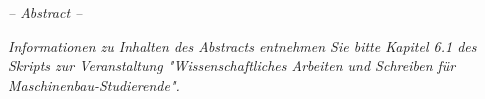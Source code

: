 \begin{center}
\begin{minipage}[c][\textheight][c]{0.7\textwidth}
    \begin{center} \textit{\Large{-- Abstract --}} \end{center}
    \emph{Informationen zu Inhalten des Abstracts entnehmen Sie bitte Kapitel 6.1 des Skripts zur Veranstaltung "Wissenschaftliches Arbeiten und Schreiben für Maschinenbau-Studierende".}
    
    \emph{\blindtext}
\end{minipage}
\end{center}